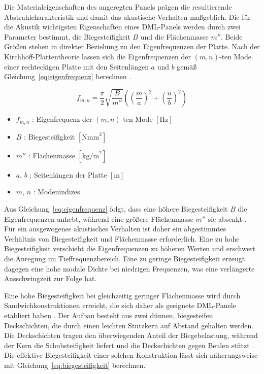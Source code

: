 Die Materialeigenschaften des angeregten Panels prägen die resultierende Abstrahlcharakteristik und damit das akustische Verhalten maßgeblich. Die für die Akustik wichtigsten Eigenschaften eines DML-Panels werden durch zwei Parameter bestimmt, die Biegesteifigkeit $B$ und die Flächenmasse $m''$. Beide Größen stehen in direkter Beziehung zu den Eigenfrequenzen der Platte. Nach der Kirchhoff-Plattentheorie lassen sich die Eigenfrequenzen der $(m,n)$-ten Mode einer rechteckigen Platte mit den Seitenlängen $a$ und $b$ gemäß Gleichung~\ref{eq:eigenfrequenz} berechnen \cite{Cremer1996}.

\begin{equation}
f_{m,n} = \frac{\pi}{2} \sqrt{\frac{B}{m''}} \left( \left(\frac{m}{a}\right)^2 + \left(\frac{n}{b}\right)^2 \right)
\label{eq:eigenfrequenz}
\end{equation}

\begin{itemize}
    \item $f_{m,n}$ : Eigenfrequenz der $(m,n)$-ten Mode $[\text{Hz}]$
    \item $B$ : Biegesteifigkeit $[\text{Nmm}^2]$
    \item $m''$ : Flächenmasse $[\text{kg/m}^2]$
    \item $a$, $b$ : Seitenlängen der Platte $[\text{m}]$
    \item $m$, $n$ : Modenindizes
\end{itemize}

Aus Gleichung~\ref{eq:eigenfrequenz} folgt, dass eine höhere Biegesteifigkeit $B$ die Eigenfrequenzen anhebt, während eine größere Flächenmasse $m''$ sie absenkt \cite{Cremer1996}. Für ein ausgewogenes akustisches Verhalten ist daher ein abgestimmtes Verhältnis von Biegesteifigkeit und Flächenmasse erforderlich. Eine zu hohe Biegesteifigkeit verschiebt die Eigenfrequenzen zu höheren Werten und erschwert die Anregung im Tieffrequenzbereich. Eine zu geringe Biegesteifigkeit erzeugt dagegen eine hohe modale Dichte bei niedrigen Frequenzen, was eine verlängerte Ausschwingzeit zur Folge hat.

Eine hohe Biegesteifigkeit bei gleichzeitig geringer Flächenmasse wird durch Sandwichkonstruktionen erreicht, die sich daher als geeignete DML-Panele etabliert haben \cite{Bai2001}. Der Aufbau besteht aus zwei dünnen, biegesteifen Deckschichten, die durch einen leichten Stützkern auf Abstand gehalten werden. Die Deckschichten tragen den überwiegenden Anteil der Biegebelastung, während der Kern die Schubsteifigkeit liefert und die Deckschichten gegen Beulen stützt \cite{Wiedemann2006}. Die effektive Biegesteifigkeit einer solchen Konstruktion lässt sich näherungsweise mit Gleichung~\ref{eq:biegesteifigkeit} berechnen.

